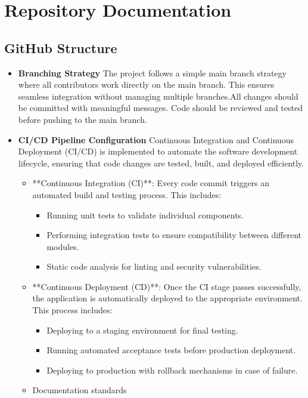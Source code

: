 \documentclass{llncs}
\begin{document}
\section{Repository Documentation}
\subsection{GitHub Structure}
\begin{itemize}
    \item \textbf{Branching Strategy}  
    The project follows a simple main branch strategy where all contributors work directly on the main branch. 
    This ensures seamless integration without managing multiple branches.All changes should be committed with meaningful messages.  
    Code should be reviewed and tested before pushing to the main branch.

    \item \textbf{CI/CD Pipeline Configuration}  
    Continuous Integration and Continuous Deployment (CI/CD) is implemented to automate the software development lifecycle, ensuring that code changes are tested, built, and deployed efficiently.  

    \begin{itemize}
        \item **Continuous Integration (CI)**:  
        Every code commit triggers an automated build and testing process. This includes:
        \begin{itemize}
            \item Running unit tests to validate individual components.
            \item Performing integration tests to ensure compatibility between different modules.
            \item Static code analysis for linting and security vulnerabilities.
        \end{itemize}

        \item **Continuous Deployment (CD)**:  
        Once the CI stage passes successfully, the application is automatically deployed to the appropriate environment. This process includes:
        \begin{itemize}
            \item Deploying to a staging environment for final testing.
            \item Running automated acceptance tests before production deployment.
            \item Deploying to production with rollback mechanisms in case of failure.
        \end{itemize}
        
    \item Documentation standards
\end{itemize}
\end{itemize}
\end{document}
